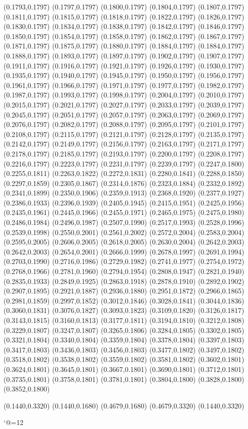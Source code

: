 (0.1793,0.1797)
(0.1797,0.1797)
(0.1800,0.1797)
(0.1804,0.1797)
(0.1807,0.1797)
(0.1811,0.1797)
(0.1815,0.1797)
(0.1818,0.1797)
(0.1822,0.1797)
(0.1826,0.1797)
(0.1830,0.1797)
(0.1834,0.1797)
(0.1838,0.1797)
(0.1842,0.1797)
(0.1846,0.1797)
(0.1850,0.1797)
(0.1854,0.1797)
(0.1858,0.1797)
(0.1862,0.1797)
(0.1867,0.1797)
(0.1871,0.1797)
(0.1875,0.1797)
(0.1880,0.1797)
(0.1884,0.1797)
\PST@Solid(0.1884,0.1797)
(0.1888,0.1797)
(0.1893,0.1797)
(0.1897,0.1797)
(0.1902,0.1797)
(0.1907,0.1797)
(0.1911,0.1797)
(0.1916,0.1797)
(0.1921,0.1797)
(0.1926,0.1797)
(0.1930,0.1797)
(0.1935,0.1797)
(0.1940,0.1797)
(0.1945,0.1797)
(0.1950,0.1797)
(0.1956,0.1797)
(0.1961,0.1797)
(0.1966,0.1797)
(0.1971,0.1797)
(0.1977,0.1797)
(0.1982,0.1797)
(0.1987,0.1797)
(0.1993,0.1797)
(0.1998,0.1797)
(0.2004,0.1797)
(0.2010,0.1797)
(0.2015,0.1797)
(0.2021,0.1797)
(0.2027,0.1797)
(0.2033,0.1797)
(0.2039,0.1797)
(0.2045,0.1797)
(0.2051,0.1797)
(0.2057,0.1797)
(0.2063,0.1797)
(0.2069,0.1797)
(0.2076,0.1797)
(0.2082,0.1797)
(0.2088,0.1797)
(0.2095,0.1797)
(0.2101,0.1797)
(0.2108,0.1797)
(0.2115,0.1797)
(0.2121,0.1797)
(0.2128,0.1797)
(0.2135,0.1797)
(0.2142,0.1797)
(0.2149,0.1797)
(0.2156,0.1797)
(0.2163,0.1797)
(0.2171,0.1797)
(0.2178,0.1797)
(0.2185,0.1797)
(0.2193,0.1797)
(0.2200,0.1797)
(0.2208,0.1797)
(0.2216,0.1797)
(0.2223,0.1797)
(0.2231,0.1797)
(0.2239,0.1797)
(0.2247,0.1800)
(0.2255,0.1811)
(0.2263,0.1822)
(0.2272,0.1831)
(0.2280,0.1841)
(0.2288,0.1850)
(0.2297,0.1859)
(0.2305,0.1867)
(0.2314,0.1876)
(0.2323,0.1884)
(0.2332,0.1892)
(0.2341,0.1899)
(0.2350,0.1906)
(0.2359,0.1913)
(0.2368,0.1920)
(0.2377,0.1927)
(0.2386,0.1933)
(0.2396,0.1939)
(0.2405,0.1945)
(0.2415,0.1951)
(0.2425,0.1956)
(0.2435,0.1961)
(0.2445,0.1966)
(0.2455,0.1971)
(0.2465,0.1975)
(0.2475,0.1980)
(0.2486,0.1984)
(0.2496,0.1987)
(0.2507,0.1990)
(0.2517,0.1993)
(0.2528,0.1996)
(0.2539,0.1998)
(0.2550,0.2001)
(0.2561,0.2002)
(0.2572,0.2004)
(0.2583,0.2004)
(0.2595,0.2005)
(0.2606,0.2005)
(0.2618,0.2005)
(0.2630,0.2004)
(0.2642,0.2003)
\PST@Solid(0.2642,0.2003)
(0.2654,0.2001)
(0.2666,0.1999)
(0.2678,0.1997)
(0.2691,0.1994)
(0.2703,0.1990)
(0.2716,0.1986)
(0.2729,0.1982)
(0.2741,0.1977)
(0.2754,0.1972)
(0.2768,0.1966)
(0.2781,0.1960)
(0.2794,0.1954)
(0.2808,0.1947)
(0.2821,0.1940)
(0.2835,0.1933)
(0.2849,0.1925)
(0.2863,0.1918)
(0.2878,0.1910)
(0.2892,0.1902)
(0.2907,0.1895)
(0.2921,0.1887)
(0.2936,0.1880)
(0.2951,0.1872)
(0.2966,0.1865)
(0.2981,0.1859)
(0.2997,0.1852)
(0.3012,0.1846)
(0.3028,0.1841)
(0.3044,0.1836)
(0.3060,0.1831)
(0.3076,0.1827)
(0.3093,0.1823)
(0.3109,0.1820)
(0.3126,0.1817)
(0.3143,0.1815)
(0.3160,0.1813)
(0.3177,0.1811)
(0.3194,0.1810)
(0.3212,0.1808)
(0.3229,0.1807)
(0.3247,0.1807)
(0.3265,0.1806)
(0.3284,0.1805)
(0.3302,0.1805)
(0.3321,0.1804)
(0.3340,0.1804)
(0.3359,0.1804)
(0.3378,0.1804)
(0.3397,0.1803)
(0.3417,0.1803)
(0.3436,0.1803)
(0.3456,0.1803)
(0.3477,0.1802)
(0.3497,0.1802)
(0.3518,0.1802)
(0.3538,0.1802)
(0.3559,0.1802)
(0.3581,0.1802)
(0.3602,0.1801)
(0.3624,0.1801)
(0.3645,0.1801)
(0.3667,0.1801)
(0.3690,0.1801)
(0.3712,0.1801)
(0.3735,0.1801)
(0.3758,0.1801)
(0.3781,0.1801)
(0.3804,0.1800)
(0.3828,0.1800)
(0.3852,0.1800)

\PST@Border(0.1440,0.3320)
(0.1440,0.1680)
(0.4679,0.1680)
(0.4679,0.3320)
(0.1440,0.3320)

\catcode`@=12
\fi
\endpspicture
